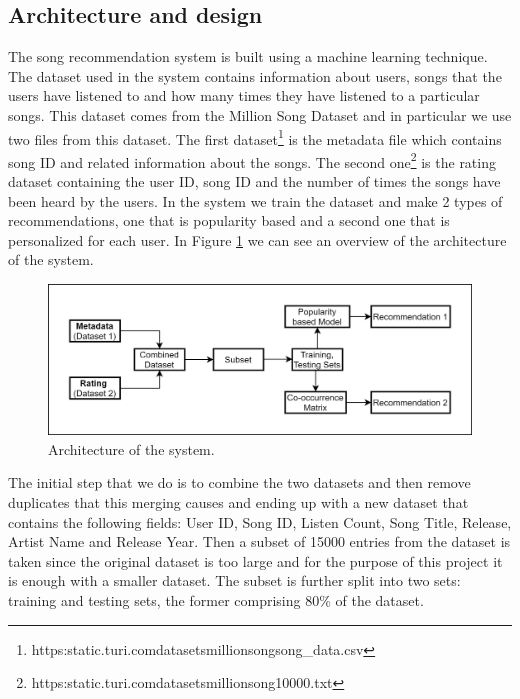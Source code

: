 \documentclass{jot}
\begin{document}
\subsection{Architecture and design}
The song recommendation system is built using a machine learning technique\cite{medium}. The dataset used in the system contains information about users, songs that the users have listened to and how many times they have listened to a particular songs. This dataset comes from the Million Song Dataset\cite{millionsongs} and in particular we use two files from this dataset. The first dataset\footnote{https:\/\/static.turi.com\/datasets\/millionsong\/song\_data.csv} is the metadata file which contains song ID and related information about the songs. The second one\footnote{https:\/\/static.turi.com\/datasets\/millionsong\/10000.txt} is the rating dataset containing the user ID, song ID and the number of times the songs have been heard by the users. In the system we train the dataset and make 2 types of recommendations, one that is popularity based and a second one that is personalized for each user. In Figure \ref{fig:architecture} we can see an overview of the architecture of the system.

\begin{figure}[h!]
    \centering%
    \includegraphics[width=\textwidth]{architecture}
    \caption{Architecture of the system.}
    \label{fig:architecture}
\end{figure}%

The initial step that we do is to combine the two datasets and then remove duplicates that this merging causes and ending up with a new dataset that contains the following fields: User ID, Song ID, Listen Count, Song Title, Release, Artist Name and Release Year. Then a subset of 15000 entries from the dataset is taken since the original dataset is too large and for the purpose of this project it is enough with a smaller dataset. The subset is further split into two sets: training and testing sets, the former comprising 80\% of the dataset.
\end{document}
